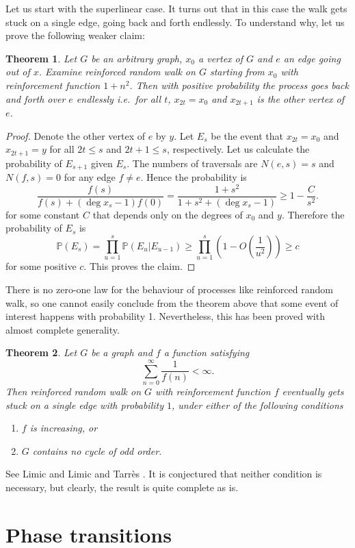 \documentclass{emsprocart}
\theoremstyle{plain}
\newtheorem{thm}{Theorem}
\begin{document}
Let us start with the superlinear case. It turns out that in this
case the walk gets stuck on a single edge, going back and forth endlessly.
To understand why, let us prove the following weaker claim:
\begin{thm}
Let $G$ be an arbitrary graph, $x_{0}$ a vertex of $G$ and $e$
an edge going out of $x$. Examine reinforced random walk on $G$
starting from $x_{0}$ with reinforcement function $1+n^{2}$. Then
with positive probability the process goes back and forth over $e$
endlessly i.e.\ for all $t$, $x_{2t}=x_{0}$ and $x_{2t+1}$ is
the other vertex of $e$.\end{thm}
\begin{proof}
Denote the other vertex of $e$ by $y$. Let $E_{s}$ be the event
that $x_{2t}=x_{0}$ and $x_{2t+1}=y$ for all $2t\le s$ and $2t+1\le s$,
respectively. Let us calculate the probability of $E_{s+1}$ given
$E_{s}$. The numbers of traversals are $N(e,s)=s$ and $N(f,s)=0$
for any edge $f\ne e$. Hence the probability is 
\[
\frac{f(s)}{f(s)+(\deg x_{s}-1)f(0)}=\frac{1+s^{2}}{1+s^{2}+(\deg x_{s}-1)}\ge1-\frac{C}{s^{2}}.
\]
for some constant $C$ that depends only on the degrees of $x_{0}$
and $y$. Therefore the probability of $E_{s}$ is 
\[
\mathbb{P}(E_{s})=\prod_{u=1}^{s}\mathbb{P}(E_{u}|E_{u-1})\ge\prod_{u=1}^{s}\left(1-O\left(\frac{1}{u^{2}}\right)\right)\ge c
\]
for some positive $c$. This proves the claim.
\end{proof}
There is no zero-one law for the behaviour of processes like reinforced
random walk, so one cannot easily conclude from the theorem above
that some event of interest happens with probability 1. Nevertheless,
this has been proved with almost complete generality. 
\begin{thm}
Let $G$ be a graph and $f$ a function satisfying 
\[
\sum_{n=0}^{\infty}\frac{1}{f(n)}<\infty.
\]
Then reinforced random walk on $G$ with reinforcement function $f$
eventually gets stuck on a single edge with probability $1$, under
either of the following conditions
\begin{enumerate}
\item $f$ is increasing, or
\item $G$ contains no cycle of odd order.
\end{enumerate}
\end{thm}
See Limic \cite{L03} and Limic and Tarr\`es \cite{LT07,LT08}. It
is conjectured that neither condition is necessary, but clearly, the
result is quite complete as is.

\section{Phase transitions}
\end{document}
